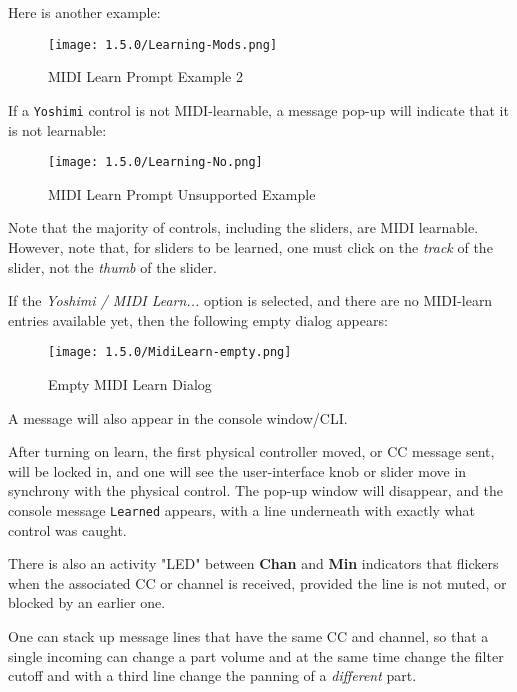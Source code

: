    Here is another example:

\begin{figure}[H]
   \centering
   \texttt{[image: 1.5.0/Learning-Mods.png]}
   \caption{MIDI Learn Prompt Example 2}
   \label{fig:midi_learn_ex_2}
\end{figure}

   If a \texttt{Yoshimi} control is not MIDI-learnable, a message pop-up
   will indicate that it is not
   learnable:

\begin{figure}[H]
   \centering
   \texttt{[image: 1.5.0/Learning-No.png]}
   \caption{MIDI Learn Prompt Unsupported Example}
   \label{fig:midi_learn_unsupported}
\end{figure}

   Note that the majority of controls, including the sliders, are MIDI
   learnable.  However, note that, for sliders to be learned, one must
   click on the \textsl{track} of the slider, not the \textsl{thumb} of the
   slider.

   If the \textsl{Yoshimi / MIDI Learn...} option is selected, and there are no
   MIDI-learn entries available yet, then the following empty dialog appears:

\begin{figure}[H]
   \centering
   \texttt{[image: 1.5.0/MidiLearn-empty.png]}
   \caption{Empty MIDI Learn Dialog}
   \label{fig:empty_midi_learn_dialog}
\end{figure}

   A message will also appear in the console window/CLI.

   After turning on learn, the first physical controller moved, or CC message
   sent, will be locked in, and one will see the user-interface knob or slider
   move in synchrony with the physical control. The pop-up window will
   disappear, and the console message \texttt{Learned} appears, with a line
   underneath with exactly what control was caught.

   There is also an activity "LED" between \textbf{Chan} and
   \textbf{Min} indicators that flickers when the associated CC or channel
   is received, provided the line is not muted, or blocked by an earlier one.

   One can stack up message lines that have the same CC and channel, so that a
   single incoming can change a part volume and at the same time change the
   filter cutoff and with a third line change the panning of a
   \textsl{different} part.

